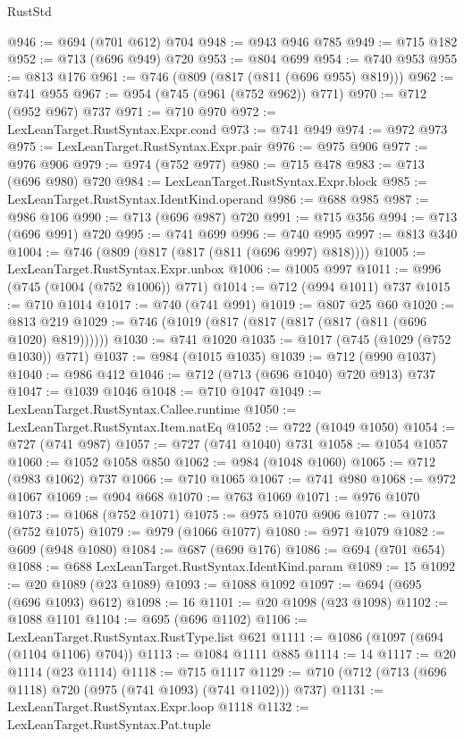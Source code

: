 \begin{lexlean}{RustStd}
\begin{coremodule}
@946 := @694 (@701 @612) @704
@948 := @943 @946 @785
@949 := @715 @182
@952 := @713 (@696 @949) @720
@953 := @804 @699
@954 := @740 @953
@955 := @813 @176
@961 := @746 (@809 (@817 (@811 (@696 @955) @819)))
@962 := @741 @955
@967 := @954 (@745 (@961 (@752 @962)) @771)
@970 := @712 (@952 @967) @737
@971 := @710 @970
@972 := LexLeanTarget.RustSyntax.Expr.cond
@973 := @741 @949
@974 := @972 @973
@975 := LexLeanTarget.RustSyntax.Expr.pair
@976 := @975 @906
@977 := @976 @906
@979 := @974 (@752 @977)
@980 := @715 @478
@983 := @713 (@696 @980) @720
@984 := LexLeanTarget.RustSyntax.Expr.block
@985 := LexLeanTarget.RustSyntax.IdentKind.operand
@986 := @688 @985
@987 := @986 @106
@990 := @713 (@696 @987) @720
@991 := @715 @356
@994 := @713 (@696 @991) @720
@995 := @741 @699
@996 := @740 @995
@997 := @813 @340
@1004 := @746 (@809 (@817 (@817 (@811 (@696 @997) @818))))
@1005 := LexLeanTarget.RustSyntax.Expr.unbox
@1006 := @1005 @997
@1011 := @996 (@745 (@1004 (@752 @1006)) @771)
@1014 := @712 (@994 @1011) @737
@1015 := @710 @1014
@1017 := @740 (@741 @991)
@1019 := @807 @25 @60
@1020 := @813 @219
@1029 := @746 (@1019 (@817 (@817 (@817 (@817 (@811 (@696 @1020) @819))))))
@1030 := @741 @1020
@1035 := @1017 (@745 (@1029 (@752 @1030)) @771)
@1037 := @984 (@1015 @1035)
@1039 := @712 (@990 @1037)
@1040 := @986 @412
@1046 := @712 (@713 (@696 @1040) @720 @913) @737
@1047 := @1039 @1046
@1048 := @710 @1047
@1049 := LexLeanTarget.RustSyntax.Callee.runtime
@1050 := LexLeanTarget.RustSyntax.Item.natEq
@1052 := @722 (@1049 @1050)
@1054 := @727 (@741 @987)
@1057 := @727 (@741 @1040) @731
@1058 := @1054 @1057
@1060 := @1052 @1058 @850
@1062 := @984 (@1048 @1060)
@1065 := @712 (@983 @1062) @737
@1066 := @710 @1065
@1067 := @741 @980
@1068 := @972 @1067
@1069 := @904 @668
@1070 := @763 @1069
@1071 := @976 @1070
@1073 := @1068 (@752 @1071)
@1075 := @975 @1070 @906
@1077 := @1073 (@752 @1075)
@1079 := @979 (@1066 @1077)
@1080 := @971 @1079
@1082 := @609 (@948 @1080)
@1084 := @687 (@690 @176)
@1086 := @694 (@701 @654)
@1088 := @688 LexLeanTarget.RustSyntax.IdentKind.param
@1089 := 15
@1092 := @20 @1089 (@23 @1089)
@1093 := @1088 @1092
@1097 := @694 (@695 (@696 @1093) @612)
@1098 := 16
@1101 := @20 @1098 (@23 @1098)
@1102 := @1088 @1101
@1104 := @695 (@696 @1102)
@1106 := LexLeanTarget.RustSyntax.RustType.list @621
@1111 := @1086 (@1097 (@694 (@1104 @1106) @704))
@1113 := @1084 @1111 @885
@1114 := 14
@1117 := @20 @1114 (@23 @1114)
@1118 := @715 @1117
@1129 := @710 (@712 (@713 (@696 @1118) @720 (@975 (@741 @1093) (@741 @1102))) @737)
@1131 := LexLeanTarget.RustSyntax.Expr.loop @1118
@1132 := LexLeanTarget.RustSyntax.Pat.tuple

\end{coremodule}
\end{lexlean}
